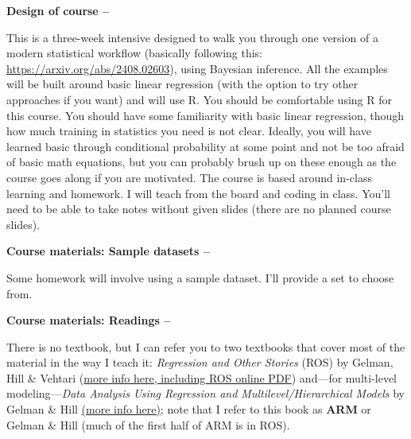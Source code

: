 \documentclass[11pt]{article}
\begin{document}


\begin{large}
{\raggedright \textbf{Design of course --}}
\end{large}
 This is a three-week intensive designed to walk you through one version of a modern statistical workflow (basically following this: \url{https://arxiv.org/abs/2408.02603}), using Bayesian inference. All the examples will be built around basic linear regression (with the option to try other approaches if you want) and will use R. You should be comfortable using R for this course.  You should have some familiarity with basic linear regression, though how much training in statistics you need is not clear. Ideally, you will have learned basic through conditional probability at some point and not be too afraid of basic math equations, but you can probably brush up on these enough as the course goes along if you are motivated. The course is based around in-class learning and homework. I will teach from the board and coding in class. You'll need to be able to take notes without given slides (there are no planned course slides). \\

\begin{large}
{\raggedright \textbf{Course materials: Sample datasets --}}
\end{large}
Some homework will involve using a sample dataset. I'll provide a set to choose from. %

\begin{large}
{\raggedright \textbf{Course materials: Readings --}}
\end{large}
There is no textbook, but I can refer you to two textbooks that cover most of the material in the way I teach it: \emph{Regression and Other Stories} (ROS) by Gelman, Hill \& Vehtari (\href{https://avehtari.github.io/ROS-Examples/}{more info here, including ROS online PDF}) and---for multi-level modeling---\emph{Data Analysis Using Regression and Multilevel/Hierarchical Models} by Gelman \& Hill \href{http://www.stat.columbia.edu/~gelman/arm/}{(more info here)}; note that I refer to this book as {\bf ARM} or Gelman \& Hill (much of the first half of ARM is in ROS). \\
\end{document}
